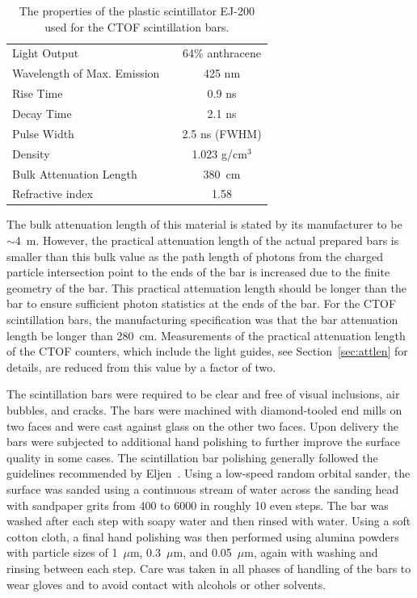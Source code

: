 \documentclass{elsart}
\begin{document}
\begin{table}[htbp]
\begin{center}
\begin{tabular}{lc} \hline
Light Output                  & 64\% anthracene \\
Wavelength of Max. Emission~~ & 425 nm \\
Rise Time                     & 0.9 ns \\
Decay Time                    & 2.1 ns \\
Pulse Width                   & 2.5 ns (FWHM) \\
Density                       & 1.023 g/cm$^3$ \\
Bulk Attenuation Length       & 380~cm \\
Refractive index              & 1.58 \\ \hline 
\end{tabular}
\end{center}
\caption{The properties of the plastic scintillator EJ-200 used for the CTOF scintillation bars.}
\label{ej200-specs}
\end{table}

The bulk attenuation length of this material is stated by its manufacturer to be $\sim$4~m. However,
the practical attenuation length of the actual prepared bars is smaller than this bulk value as the path
length of photons from the charged particle intersection point to the ends of the bar is increased due
to the finite geometry of the bar. This practical attenuation length should be longer than the bar to
ensure sufficient photon statistics at the ends of the bar. For the CTOF scintillation bars, the
manufacturing specification was that the bar attenuation length be longer than 280~cm. Measurements
of the practical attenuation length of the CTOF counters, which include the light guides, see
Section~\ref{sec:attlen} for details, are reduced from this value by a factor of two.

The scintillation bars were required to be clear and free of visual inclusions, air bubbles,
and cracks. The bars were machined with diamond-tooled end mills on two faces and were cast
against glass on the other two faces. Upon delivery the bars were subjected to additional
hand polishing to further improve the surface quality in some cases. The scintillation bar
polishing generally followed the guidelines recommended by Eljen~\cite{eljen-guide}. Using a
low-speed random orbital sander, the surface was sanded using a continuous stream of water
across the sanding head with sandpaper grits from 400 to 6000 in roughly 10 even steps. The 
bar was washed after each step with soapy water and then rinsed with water. Using a soft 
cotton cloth, a final hand polishing was then performed using alumina powders with particle 
sizes of 1~$\mu$m, 0.3~$\mu$m, and 0.05~$\mu$m, again with washing and rinsing between
each step. Care was taken in all phases of handling of the bars to wear gloves and to avoid contact 
with alcohols or other solvents.
\end{document}
